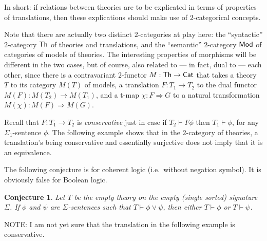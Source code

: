 \documentclass[12pt]{article}
\newtheorem{conj}[prop]{Conjecture}
\theoremstyle{definition}
\theoremstyle{remark}
\newcommand{\3}{\mathcal}
\begin{document}
In short: if relations between theories are to be explicated in terms
of properties of translations, then these explications should make use
of $2$-categorical concepts.

Note that there are actually two distinct $2$-categories at play here:
the ``syntactic'' $2$-category $\mathsf{Th}$ of theories and translations,
and the ``semantic'' $2$-category $\mathsf{Mod}$ of categories of models of
theories. The interesting properties of morphisms will be different in
the two cases, but of course, also related to --- in fact, dual to ---
each other, since there is a contravariant $2$-functor
$M:\mathsf{Th}\to\mathsf{Cat}$ that takes a theory $T$ to its category $M(T)$ of
models, a translation $F:T_1\to T_2$ to the dual functor
$M(F):M(T_2)\to M(T_1)$, and a t-map $\chi : F\Rightarrow G$ to a
natural transformation $M(\chi ):M(F)\Rightarrow M(G)$.

Recall that $F:T_1\to T_2$ is \emph{conservative} just in case if
$T_2\vdash F\phi$ then $T_1\vdash \phi$, for any $\Sigma _1$-sentence
$\phi$.  The following example shows that in the $2$-category of
theories, a translation's being conservative and essentially
surjective does not imply that it is an equivalence.

The following conjecture is for coherent logic (i.e.\ without negation
symbol). It is obviously false for Boolean logic.

\begin{conj} Let $T$ be the empty theory on the empty (single sorted)
  signature $\Sigma$. If $\phi$ and $\psi$ are $\Sigma$-sentences such
  that $T\vdash\phi\vee\psi$, then either $T\vdash\phi$ or
  $T\vdash\psi$. \end{conj}

NOTE: I am not yet sure that the translation in the following example
is conservative. 
\end{document}
